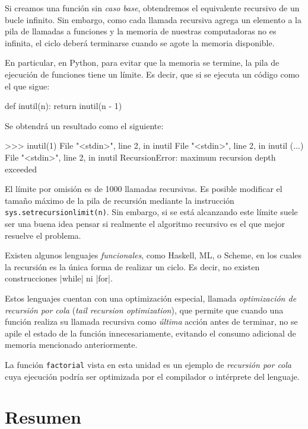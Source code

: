 Si creamos una función sin \emph{caso base}, obtendremos el equivalente
recursivo de un bucle infinito.  Sin embargo, como cada llamada recursiva
agrega un elemento a la pila de llamadas a funciones y la memoria de
nuestras computadoras no es infinita, el ciclo deberá terminarse cuando se
agote la memoria disponible.

En particular, en Python, para evitar que la memoria se termine, la pila de
ejecución de funciones tiene un límite. Es decir, que si se ejecuta un
código como el que sigue:

\begin{codigo-python-sn}
def inutil(n):
    return inutil(n - 1)
\end{codigo-python-sn}

Se obtendrá un resultado como el siguiente:

\begin{codigo-python-sn}
>>> inutil(1)
  File "<stdin>", line 2, in inutil
  File "<stdin>", line 2, in inutil
  (...)
  File "<stdin>", line 2, in inutil
RecursionError: maximum recursion depth exceeded
\end{codigo-python-sn}

El límite por omisión es de 1000 llamadas recursivas. Es posible modificar
el tamaño máximo de la pila de recursión mediante la instrucción
\lstinline!sys.setrecursionlimit(n)!.  Sin embargo, si se está alcanzando
este límite suele ser una buena idea pensar si realmente el algoritmo
recursivo es el que mejor resuelve el problema.

\begin{sabias_que}
Existen algunos lenguajes \emph{funcionales}, como Haskell, ML, o Scheme, en
los cuales la recursión es la única forma de realizar un ciclo.  Es
decir, no existen construcciones |while| ni |for|.

Estos lenguajes cuentan con una optimización especial, llamada
\emph{optimización de recursión por cola} (\emph{tail recursion optimization}),
que permite que cuando una función realiza su llamada recursiva como
\emph{última} acción antes de terminar, no se apile el estado de la función
innecesariamente, evitando el consumo adicional de memoria mencionado
anteriormente.

La función \lstinline!factorial! vista en esta unidad es un ejemplo de
\emph{recursión por cola} cuya ejecución podría ser optimizada por el compilador o
intérprete del lenguaje.
\end{sabias_que}

\section{Resumen}


